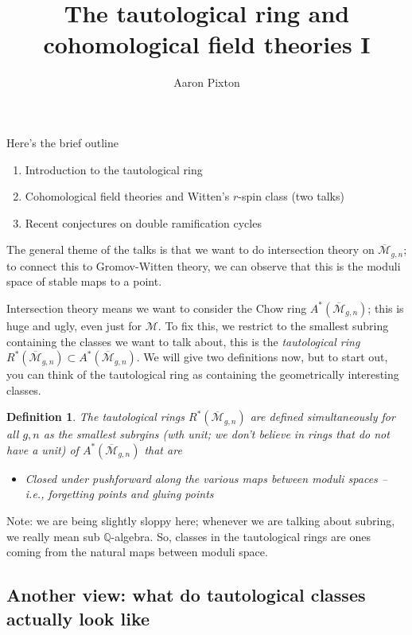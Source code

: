 \documentclass{amsart}
\title{The tautological ring and cohomological field theories I}
\author{Aaron Pixton}
\newtheorem{definition}{Definition}
\newcommand{\Mbar}{\overline{\mathcal{M}}}
\newcommand{\M}{\mathcal{M}}
\newcommand{\Q}{\mathbb{Q}}
\begin{document}
\maketitle

Here's the brief outline

\begin{enumerate}
\item Introduction to the tautological ring
\item Cohomological field theories and Witten's $r$-spin class (two talks)
\item Recent conjectures on double ramification cycles
\end{enumerate}

The general theme of the talks is that we want to do intersection theory on $\Mbar_{g,n}$; to connect this to Gromov-Witten theory, we can observe that this is the moduli space of stable maps to a point.

Intersection theory means we want to consider the Chow ring $A^*(\Mbar_{g,n})$; this is huge and ugly, even just for $\M$.  To fix this, we restrict to the smallest subring containing the classes we want to talk about, this is the \emph{tautological ring} $R^*(\Mbar_{g,n})\subset A^*(\Mbar_{g,n})$.  We will give two definitions now, but to start out, you can think of the tautological ring as containing the geometrically interesting classes.

\begin{definition} The tautological rings $R^*(\Mbar_{g,n})$ are defined simultaneously for all $g,n$ as the smallest subrgins (wth unit; we don't believe in rings that do not have a unit) of $A^*(\Mbar_{g,n})$ that are
\begin{itemize}
\item Closed under pushforward along the various maps between moduli spaces -- i.e., forgetting points and gluing points

\end{itemize}

\end{definition}


Note: we are being slightly sloppy here; whenever we are talking about subring, we really mean sub $\Q$-algebra.  
So, classes in the tautological rings are ones coming from the natural maps between moduli space.

\subsection{Another view: what do tautological classes actually look like}
\end{document}
